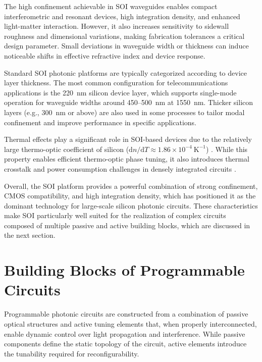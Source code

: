 The high confinement achievable in SOI waveguides enables compact interferometric and 
resonant devices, high integration density, and enhanced light-matter interaction. However, 
it also increases sensitivity to sidewall roughness and dimensional variations, making fabrication 
tolerances a critical design parameter. Small deviations in waveguide width or thickness can 
induce noticeable shifts in effective refractive index and device response.

Standard SOI photonic platforms are typically categorized according to device layer thickness. 
The most common configuration for telecommunications applications is the 220~nm silicon device 
layer, which supports single-mode operation for waveguide widths around 450–500~nm at 1550~nm. 
Thicker silicon layers (e.g., 300~nm or above) are also used in some processes to tailor modal 
confinement and improve performance in specific applications.

Thermal effects play a significant role in SOI-based devices due to the relatively large 
thermo-optic coefficient of silicon 
($\mathrm{d}n/\mathrm{d}T \approx 1.86 \times 10^{-4}~\mathrm{K}^{-1}$) 
\cite{cocorulloThermoopticalModulation15mm1992}. While this property enables efficient 
thermo-optic phase tuning, it also introduces thermal crosstalk and power consumption challenges 
in densely integrated circuits \cite{wattsAdiabaticThermoopticMach2013,
jacquesOptimizationThermoopticPhaseshifter2019, coenenAnalysisThermalCrosstalk2022}.

Overall, the SOI platform provides a powerful combination of strong confinement, CMOS 
compatibility, and high integration density, which has positioned it as the dominant technology 
for large-scale silicon photonic circuits. These characteristics make SOI particularly well 
suited for the realization of complex circuits composed of multiple passive and active building 
blocks, which are discussed in the next section.



\section{Building Blocks of Programmable Circuits}

Programmable photonic circuits are constructed from a combination of passive optical structures 
and active tuning elements that, when properly interconnected, enable dynamic control over light 
propagation and interference. While passive components define the static topology of the circuit, 
active elements introduce the tunability required for reconfigurability.

